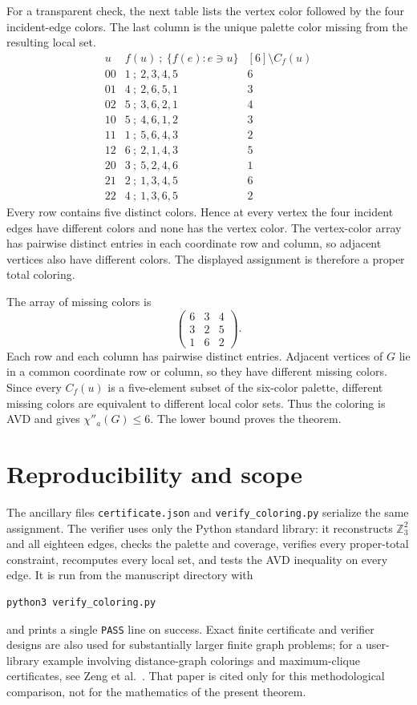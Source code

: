 \documentclass[11pt]{article}
\newcommand{\Z}{\mathbb Z}
\begin{document}
For a transparent check, the next table lists the vertex color followed by
the four incident-edge colors.  The last column is the unique palette color
missing from the resulting local set.
\[
\begin{array}{c|c|c}
u& f(u)\ ;\ \{f(e):e\ni u\}&[6]\setminus C_f(u)\\ \hline
00&1\ ;\ 2,3,4,5&6\\
01&4\ ;\ 2,6,5,1&3\\
02&5\ ;\ 3,6,2,1&4\\
10&5\ ;\ 4,6,1,2&3\\
11&1\ ;\ 5,6,4,3&2\\
12&6\ ;\ 2,1,4,3&5\\
20&3\ ;\ 5,2,4,6&1\\
21&2\ ;\ 1,3,4,5&6\\
22&4\ ;\ 1,3,6,5&2
\end{array}
\]
Every row contains five distinct colors.  Hence at every vertex the four
incident edges have different colors and none has the vertex color.  The
vertex-color array has pairwise distinct entries in each coordinate row and
column, so adjacent vertices also have different colors.  The displayed
assignment is therefore a proper total coloring.

The array of missing colors is
\[
\begin{pmatrix}
6&3&4\\
3&2&5\\
1&6&2
\end{pmatrix}.
\]
Each row and each column has pairwise distinct entries.  Adjacent vertices of
$G$ lie in a common coordinate row or column, so they have different missing
colors.  Since every $C_f(u)$ is a five-element subset of the six-color
palette, different missing colors are equivalent to different local color
sets.  Thus the coloring is AVD and gives $\chi''_a(G)\leq6$.  The lower bound
proves the theorem.

\section{Reproducibility and scope}

The ancillary files \texttt{certificate.json} and
\texttt{verify\_coloring.py} serialize the same assignment.  The verifier uses
only the Python standard library: it reconstructs $\Z_3^2$ and all eighteen
edges, checks the palette and coverage, verifies every proper-total constraint,
recomputes every local set, and tests the AVD inequality on every edge.  It is
run from the manuscript directory with
\begin{verbatim}
python3 verify_coloring.py
\end{verbatim}
and prints a single \texttt{PASS} line on success.  Exact finite certificate
and verifier designs are also used for substantially larger finite graph
problems; for a user-library example involving distance-graph colorings and
maximum-clique certificates, see Zeng et al.~\cite{ZengEtAl2026Certificates}.
That paper is cited only for this methodological comparison, not for the
mathematics of the present theorem.
\end{document}

